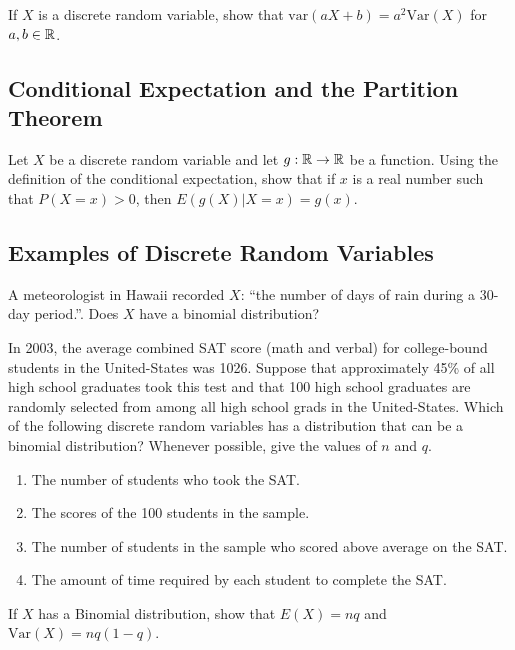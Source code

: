 \begin{problem}
If $X$ is a discrete random variable, show that $\mathrm{var} (aX + b) = a^2 \mathrm{Var} (X)$ for $a, b \in \mathbb{R}$.
\end{problem}

\subsection{Conditional Expectation and the Partition Theorem}

\begin{problem}
Let $X$ be a discrete random variable and let $g : \mathbb{R} \rightarrow \mathbb{R}$ be a function. Using the definition of the conditional expectation, show that if $x$ is a real number such that $P (X = x) > 0$, then $E (g (X) | X = x) = g (x)$. 
\end{problem}

\subsection{Examples of Discrete Random Variables}

\begin{problem}
A meteorologist in Hawaii recorded $X$: ``the number of days of rain during a 30-day period.''. Does $X$ have a binomial distribution?
\end{problem}

\begin{problem}
In 2003, the average combined SAT score (math and verbal) for college-bound students in the United-States was 1026. Suppose that approximately 45\% of all high school graduates took this test and that 100 high school graduates are randomly selected from among all high school grads in the United-States. Which of the following discrete random variables has a distribution that can be a binomial distribution? Whenever possible, give the values of $n$ and $q$.
\begin{enumerate}[label=\alph*)]
    \item The number of students who took the SAT.
    \item The scores of the 100 students in the sample.
    \item The number of students in the sample who scored above average on the SAT.
    \item The amount of time required by each student to complete the SAT.
\end{enumerate}
\end{problem}

\begin{problem}
If $X$ has a Binomial distribution, show that $E (X) = nq$ and $\mathrm{Var} (X) = nq (1 - q)$.
\end{problem}

